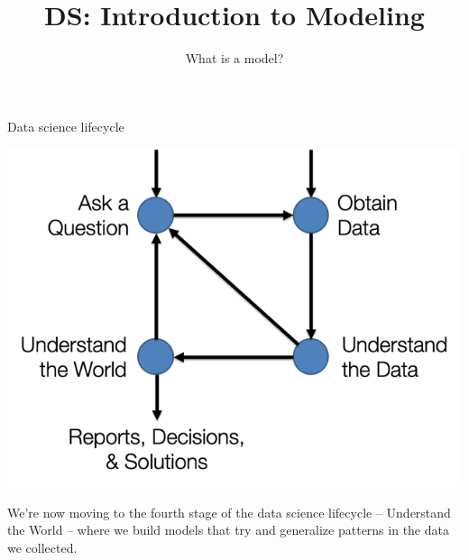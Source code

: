 \documentclass[aspectratio=169]{../latex_main/tntbeamer}  %
\title[Introduction]{DS: Introduction to Modeling}
\subtitle{What is a model?}
\begin{document}
	
	\maketitle
	\begin{frame}{Data science lifecycle}
	    \begin{center}
	        \includegraphics[scale=.65]{Bild1}
	    \end{center}
	    
	    We’re now moving to the fourth stage of the data science lifecycle – Understand the World – where we build models that try and generalize patterns in the data we collected.
	\end{frame}
	
\end{document}
